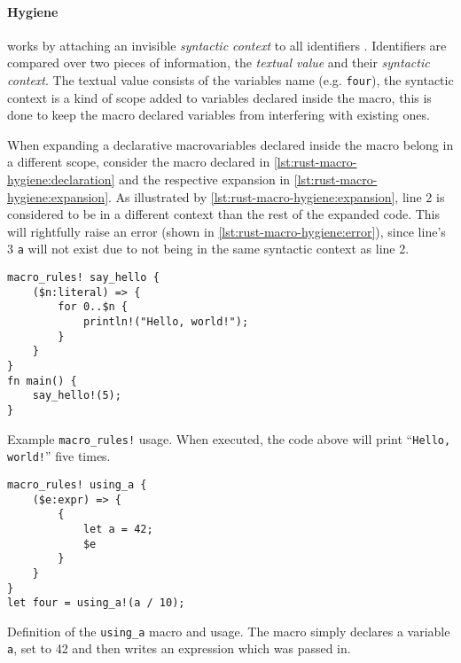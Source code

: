\paragraph{Hygiene} works by attaching an invisible \emph{syntactic context} to all identifiers \autocite{Wirth2021}.
Identifiers are compared over two pieces of information,
the \emph{textual value} and their \emph{syntactic context}.
The textual value consists of the variables name (e.g. \texttt{four}),
the syntactic context is a kind of scope added to variables declared inside the macro,
this is done to keep the macro declared variables from interfering with existing ones.

When expanding a declarative macro\footnotemark variables declared inside the macro belong in a different scope,
consider the macro declared in \autoref{lst:rust-macro-hygiene:declaration} and
the respective expansion in \autoref{lst:rust-macro-hygiene:expansion}.
As illustrated by \autoref{lst:rust-macro-hygiene:expansion},
line 2 is considered to be in a different context than the rest of the expanded code.
This will rightfully raise an error (shown in \autoref{lst:rust-macro-hygiene:error}),
since line's 3 \texttt{a} will not exist due to not being in the same syntactic context as line 2.


\begin{listing}
    \centering
    \begin{verbatim}
macro_rules! say_hello {
    ($n:literal) => {
        for 0..$n {
            println!("Hello, world!");
        }
    }
}
fn main() {
    say_hello!(5);
}
    \end{verbatim}
    \caption{Example \texttt{macro\_rules!} usage.
        When executed, the code above will print “\texttt{Hello, world!}” five times.}
    \label{lst:rust-macro-rules}
\end{listing}


\begin{listing}
    \begin{verbatim}
macro_rules! using_a {
    ($e:expr) => {
        {
            let a = 42;
            $e
        }
    }
}
let four = using_a!(a / 10);
    \end{verbatim}
    \caption{
        Definition of the \texttt{using\_a} macro and usage.
        The macro simply declares a variable \texttt{a},
        set to 42 and then writes an expression which was passed in.
    }
    \label{lst:rust-macro-hygiene:declaration}
\end{listing}

